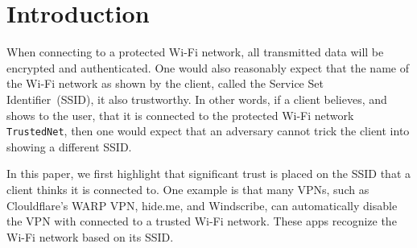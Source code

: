 \documentclass[sigconf,review,anonymous]{acmart}
\newcommand{\wifi}{\mbox{Wi-Fi}}
\begin{document}
\begin{abstract}
When using protected \wifi{} protocols such as WPA2 and WPA3, the access point that you connect to is authenticated by the client.
This prevents an adversary from creating a rogue clone of the \wifi{} network, and implies that the name of a network, called SSID, cannot be spoofed.
%
However, in this paper we demonstrate that a client can be tricked into connecting to a different protected \wifi{} network than the one it intended to connect to. That is, the client's user interface will show a different SSID than the one of the actual network it is connected to.
The root cause is a design flaw in the IEEE 802.11 standard, namely, the SSID is not always authenticated.
We demonstrate the practical impact of this attack, find that all devices are vulnerable to the attack, and propose backwards-compatible defenses as well as updates to the standard.
\end{abstract}

\maketitle

\section{Introduction}

When connecting to a protected \wifi{} network, all transmitted data will be encrypted and authenticated.
One would also reasonably expect that the name of the \wifi{} network as shown by the client, called the Service Set Identifier~(SSID), it also trustworthy.
In other words, if a client believes, and shows to the user, that it is connected to the protected \wifi{} network \verb|TrustedNet|, then one would expect that an adversary cannot trick the client into showing a different SSID.

In this paper, we first highlight that significant trust is placed on the SSID that a client thinks it is connected to.
One example is that many VPNs, such as Clouldflare's WARP VPN, hide.me, and Windscribe, can automatically disable the VPN with connected to a trusted \wifi{} network.
These apps recognize the \wifi{} network based on its SSID.
\end{document}
